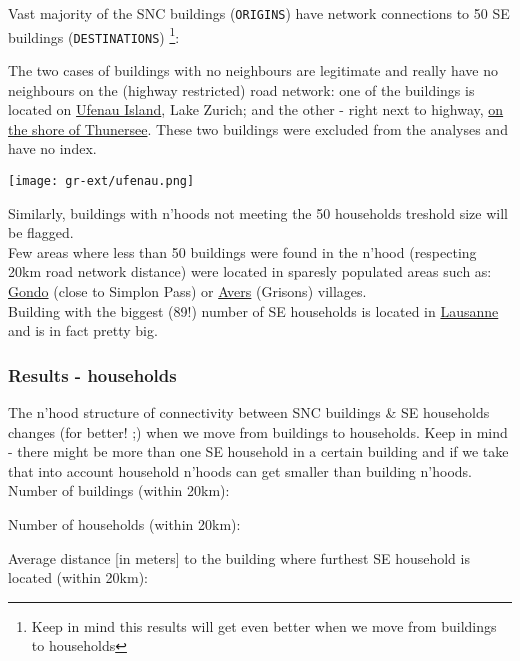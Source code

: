 \documentclass[a4paper, notitlepage, fleqn]{article} %
\begin{document}
{Vast majority of the SNC buildings (\texttt{ORIGINS}) have network connections to 50 SE buildings (\texttt{DESTINATIONS})
\footnote{Keep in mind this results will get even better when we move from buildings to households}: 
\begin{stlog}\end{stlog}
The two cases of buildings with no neighbours are legitimate and really have no neighbours on the (highway restricted) road network: 
	one of the buildings is located on \href{https://goo.gl/maps/L5sLmrMXZap}{Ufenau Island}, Lake Zurich; 
	and the other - right next to highway,  \href{https://goo.gl/maps/fxPCBS5TmEQ2}{on the shore of Thunersee}. 
	These two buildings were excluded from the analyses and have no index. \\
	
\begin{center}
\texttt{[image: gr-ext/ufenau.png]} 
\end{center}

Similarly, buildings with n'hoods not meeting the 50 households treshold size will be flagged. \\

Few areas where less than 50 buildings were found in the n'hood (respecting 20km road network distance) were located in sparesly populated areas such as:
	\href{https://goo.gl/maps/BXbgyCYtuGU2}{Gondo} (close to Simplon Pass) or \href{https://goo.gl/maps/mg15ptJPVTJ2}{Avers} (Grisons) villages. \\

Building with the biggest (89!) number of SE households is located in \href{https://goo.gl/maps/oFeag8mQFdS2}{Lausanne} and is in fact pretty big.
\subsubsection{Results - households}

The n'hood structure of connectivity between SNC buildings \& SE households changes (for better! ;)
when we move from buildings to households. 
Keep in mind - there might be more than one SE household in a certain building and if we take that into account 
household n'hoods can get smaller than building n'hoods. 
Number of buildings (within 20km):
\begin{stlog}\end{stlog}
Number of households (within 20km):
\begin{stlog}\end{stlog}
Average distance [in meters] to the building where furthest SE household is located (within 20km):
\begin{stlog}\end{stlog}
}
\end{document}
